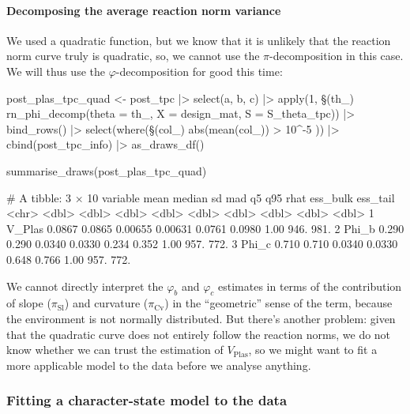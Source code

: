 \documentclass[a4paper,12pt,twoside]{article}
\begin{document}
\paragraph{Decomposing the average reaction norm variance}
We used a quadratic function, but we know that it is unlikely that the reaction norm curve truly is quadratic, so, we cannot use the $\pi$-decomposition in this case. We will thus use the $\varphi$-decomposition for good this time:
\begin{Rinput}
post_plas_tpc_quad <-
    post_tpc |>
    select(a, b, c) |>
    apply(1, \§§(th_) rn_phi_decomp(theta = th_, X = design_mat, S = S_theta_tpc)) |>
    bind_rows()  |>
    select(where(\§§(col_) { abs(mean(col_)) > 10^-5 })) |>
    cbind(post_tpc_info) |>
    as_draws_df()

summarise_draws(post_plas_tpc_quad)
\end{Rinput}
\begin{Routput}
# A tibble: 3 × 10
  variable   mean median      sd     mad     q5    q95  rhat ess_bulk ess_tail
  <chr>     <dbl>  <dbl>   <dbl>   <dbl>  <dbl>  <dbl> <dbl>    <dbl>    <dbl>
1 V_Plas   0.0867 0.0865 0.00655 0.00631 0.0761 0.0980  1.00     946.     981.
2 Phi_b    0.290  0.290  0.0340  0.0330  0.234  0.352   1.00     957.     772.
3 Phi_c    0.710  0.710  0.0340  0.0330  0.648  0.766   1.00     957.     772.
\end{Routput}
We cannot directly interpret the $\varphi_{b}$ and $\varphi_{c}$ estimates in terms of the contribution of slope ($\pi_{\text{Sl}}$) and curvature ($\pi_{\text{Cv}}$) in the ``geometric'' sense of the term, because the environment is not normally distributed.
But there's another problem: given that the quadratic curve does not entirely follow the reaction norms, we do not know whether we can trust the estimation of $V_{\text{Plas}}$, so we might want to fit a more applicable model to the data before we analyse anything.

\subsubsection{Fitting a character-state model to the data}
\label{subsubsec_tpc_cs}
\end{document}
